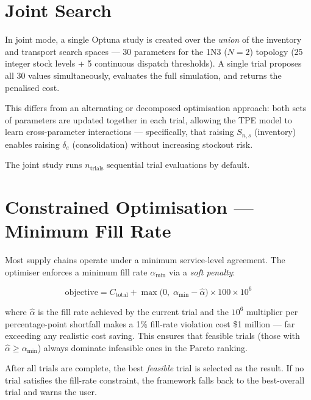 \section{Joint Search}
\label{sec:opt:joint}

In joint mode, a single Optuna study is created over the \emph{union} of
the inventory and transport search spaces — 30 parameters for the 1N3
($N=2$) topology (25 integer stock levels + 5 continuous dispatch
thresholds).  A single trial proposes all 30 values simultaneously,
evaluates the full simulation, and returns the penalised cost.

This differs from an alternating or decomposed optimisation approach:
both sets of parameters are updated together in each trial, allowing
the TPE model to learn cross-parameter interactions — specifically, that
raising $S_{n,s}$ (inventory) enables raising $\delta_e$ (consolidation)
without increasing stockout risk.

The joint study runs $n_\text{trials}$ sequential trial evaluations by default.

\section{Constrained Optimisation --- Minimum Fill Rate}
\label{sec:opt:constraint}

Most supply chains operate under a minimum service-level agreement.  The
optimiser enforces a minimum fill rate $\alpha_{\min}$ via a
\emph{soft penalty}:

\begin{equation}
  \text{objective} = C_{\text{total}} + \max\!\bigl(0,\;
    \alpha_{\min} - \hat{\alpha}\bigr) \times 100 \times 10^6
  \label{eq:penalty}
\end{equation}

where $\hat{\alpha}$ is the fill rate achieved by the current trial and
the $10^6$ multiplier per percentage-point shortfall makes a 1\%
fill-rate violation cost \$1 million — far exceeding any realistic cost
saving.  This ensures that feasible trials (those with $\hat{\alpha} \geq
\alpha_{\min}$) always dominate infeasible ones in the Pareto ranking.

After all trials are complete, the best \emph{feasible} trial is selected
as the result.  If no trial satisfies the fill-rate constraint, the
framework falls back to the best-overall trial and warns the user.

